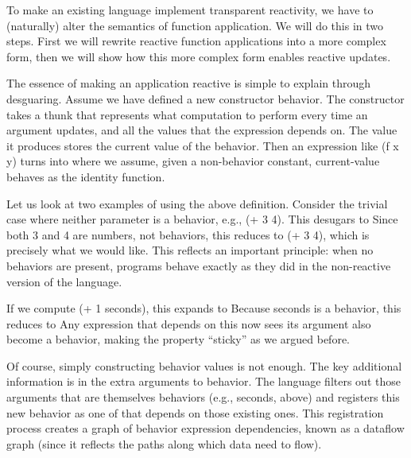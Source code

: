 
To make an existing language implement transparent reactivity, we have to
(naturally) alter the semantics of function application. We will do this in two
steps. First we will rewrite reactive function applications into a more complex
form, then we will show how this more complex form enables reactive updates.

\secdown


The essence of making an application reactive is simple to explain through
desguaring. Assume we have defined a new constructor behavior. The constructor
takes a thunk that represents what computation to perform every time an argument
updates, and all the values that the expression depends on. The value it
produces stores the current value of the behavior. Then an expression like (f x
y) turns into
where we assume, given a non-behavior constant, current-value behaves as the
identity function.

Let us look at two examples of using the above definition. Consider the trivial
case where neither parameter is a behavior, e.g., (+ 3 4). This desugars to
Since both 3 and 4 are numbers, not behaviors, this reduces to (+ 3 4), which is
precisely what we would like. This reflects an important principle: when no
behaviors are present, programs behave exactly as they did in the non-reactive
version of the language.

If we compute (+ 1 seconds), this expands to
Because seconds is a behavior, this reduces to
Any expression that depends on this now sees its argument also become a
behavior, making the property “sticky” as we argued before.



Of course, simply constructing behavior values is not enough. The key additional
information is in the extra arguments to behavior. The language filters out
those arguments that are themselves behaviors (e.g., seconds, above) and
registers this new behavior as one of that depends on those existing ones. This
registration process creates a graph of behavior expression dependencies, known
as a dataflow graph (since it reflects the paths along which data need to flow).

